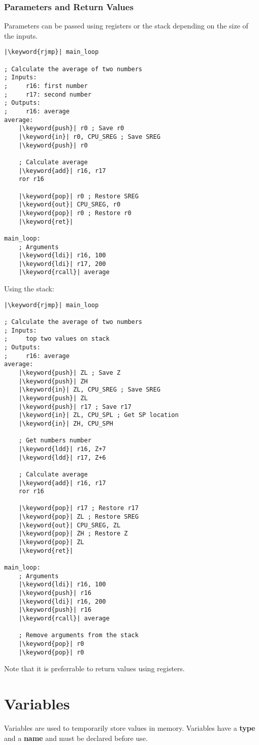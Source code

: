 \documentclass[a4paper]{report}
\newcommand{\keyword}[1]{\textcolor[rgb]{0.00,0.50,0.00}{\textbf{#1}}}
\begin{document}
\subsection{Parameters and Return Values}
Parameters can be passed using registers or the stack depending on the
size of the inputs.
\begin{verbatim}
|\keyword{rjmp}| main_loop

; Calculate the average of two numbers
; Inputs:
;     r16: first number
;     r17: second number
; Outputs:
;     r16: average
average:
    |\keyword{push}| r0 ; Save r0
    |\keyword{in}| r0, CPU_SREG ; Save SREG
    |\keyword{push}| r0

    ; Calculate average
    |\keyword{add}| r16, r17
    ror r16

    |\keyword{pop}| r0 ; Restore SREG
    |\keyword{out}| CPU_SREG, r0
    |\keyword{pop}| r0 ; Restore r0
    |\keyword{ret}|

main_loop:
    ; Arguments
    |\keyword{ldi}| r16, 100
    |\keyword{ldi}| r17, 200
    |\keyword{rcall}| average
\end{verbatim}
Using the stack:
\begin{verbatim}
|\keyword{rjmp}| main_loop

; Calculate the average of two numbers
; Inputs:
;     top two values on stack
; Outputs:
;     r16: average
average:
    |\keyword{push}| ZL ; Save Z
    |\keyword{push}| ZH
    |\keyword{in}| ZL, CPU_SREG ; Save SREG
    |\keyword{push}| ZL
    |\keyword{push}| r17 ; Save r17
    |\keyword{in}| ZL, CPU_SPL ; Get SP location
    |\keyword{in}| ZH, CPU_SPH

    ; Get numbers number
    |\keyword{ldd}| r16, Z+7
    |\keyword{ldd}| r17, Z+6

    ; Calculate average
    |\keyword{add}| r16, r17
    ror r16

    |\keyword{pop}| r17 ; Restore r17
    |\keyword{pop}| ZL ; Restore SREG
    |\keyword{out}| CPU_SREG, ZL
    |\keyword{pop}| ZH ; Restore Z
    |\keyword{pop}| ZL
    |\keyword{ret}|

main_loop:
    ; Arguments
    |\keyword{ldi}| r16, 100
    |\keyword{push}| r16
    |\keyword{ldi}| r16, 200
    |\keyword{push}| r16
    |\keyword{rcall}| average

    ; Remove arguments from the stack
    |\keyword{pop}| r0
    |\keyword{pop}| r0
\end{verbatim}
Note that it is preferrable to return values using registers.
\chapter{Variables}
Variables are used to temporarily store values in memory. Variables
have a \textbf{type} and a \textbf{name} and must be declared before
use.
\end{document}
